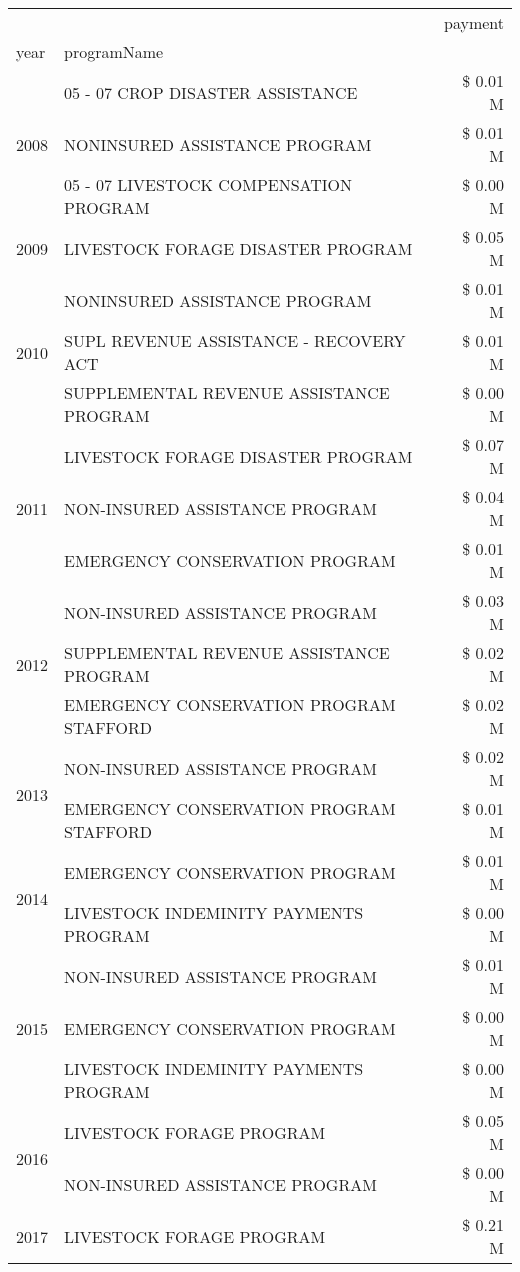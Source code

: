 \begin{tabular}{llr}
\toprule
 &  & payment \\
year & programName &  \\
\midrule
\multirow[t]{3}{*}{2008} & 05 - 07 CROP DISASTER ASSISTANCE & \$ 0.01 M \\
 & NONINSURED ASSISTANCE PROGRAM & \$ 0.01 M \\
 & 05 - 07 LIVESTOCK COMPENSATION PROGRAM & \$ 0.00 M \\
\cline{1-3}
2009 & LIVESTOCK FORAGE DISASTER  PROGRAM & \$ 0.05 M \\
\cline{1-3}
\multirow[t]{3}{*}{2010} & NONINSURED ASSISTANCE PROGRAM & \$ 0.01 M \\
 & SUPL REVENUE ASSISTANCE - RECOVERY ACT & \$ 0.01 M \\
 & SUPPLEMENTAL REVENUE ASSISTANCE PROGRAM & \$ 0.00 M \\
\cline{1-3}
\multirow[t]{3}{*}{2011} & LIVESTOCK FORAGE DISASTER PROGRAM & \$ 0.07 M \\
 & NON-INSURED ASSISTANCE PROGRAM & \$ 0.04 M \\
 & EMERGENCY CONSERVATION PROGRAM & \$ 0.01 M \\
\cline{1-3}
\multirow[t]{3}{*}{2012} & NON-INSURED ASSISTANCE PROGRAM & \$ 0.03 M \\
 & SUPPLEMENTAL REVENUE ASSISTANCE PROGRAM & \$ 0.02 M \\
 & EMERGENCY CONSERVATION PROGRAM STAFFORD & \$ 0.02 M \\
\cline{1-3}
\multirow[t]{2}{*}{2013} & NON-INSURED ASSISTANCE PROGRAM & \$ 0.02 M \\
 & EMERGENCY CONSERVATION PROGRAM STAFFORD & \$ 0.01 M \\
\cline{1-3}
\multirow[t]{2}{*}{2014} & EMERGENCY CONSERVATION PROGRAM & \$ 0.01 M \\
 & LIVESTOCK INDEMINITY PAYMENTS PROGRAM & \$ 0.00 M \\
\cline{1-3}
\multirow[t]{3}{*}{2015} & NON-INSURED ASSISTANCE PROGRAM & \$ 0.01 M \\
 & EMERGENCY CONSERVATION PROGRAM & \$ 0.00 M \\
 & LIVESTOCK INDEMINITY PAYMENTS PROGRAM & \$ 0.00 M \\
\cline{1-3}
\multirow[t]{2}{*}{2016} & LIVESTOCK FORAGE PROGRAM & \$ 0.05 M \\
 & NON-INSURED ASSISTANCE PROGRAM & \$ 0.00 M \\
\cline{1-3}
\multirow[t]{3}{*}{2017} & LIVESTOCK FORAGE PROGRAM & \$ 0.21 M \\

\end{tabular}
